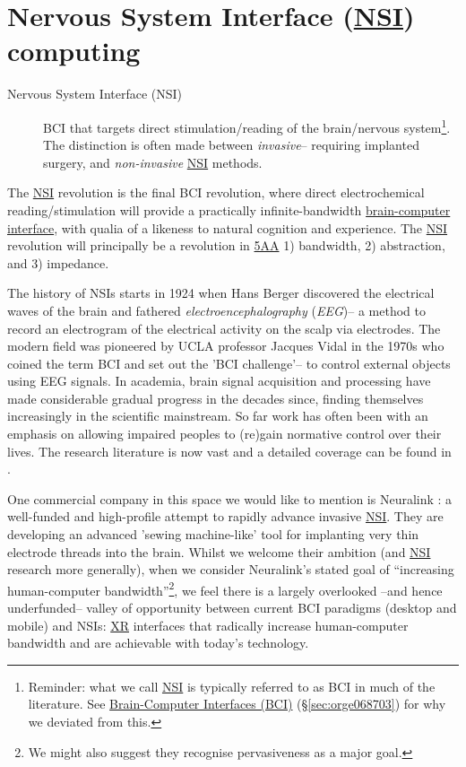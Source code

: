 \documentclass[logo,bsc,singlespacing,parskip]{infthesis}
\begin{document}
\section{Nervous System Interface (\hyperref[org559faaa]{NSI}) computing}
\label{sec:org109b124}
\begin{mdframed}
\begin{description}
\item[{Nervous System Interface (\label{org559faaa}NSI)}] BCI that targets direct stimulation/reading of the brain/nervous system\footnote{Reminder: what we call \hyperref[org559faaa]{NSI} is typically referred to as BCI in much of the literature. See \hyperref[sec:orge068703]{Brain-Computer Interfaces (BCI)} (\S \ref{sec:orge068703}) for why we deviated from this.}.
The distinction is often made between \emph{invasive}-- requiring implanted surgery, and \emph{non-invasive} \hyperref[org559faaa]{NSI} methods.
\end{description}
\end{mdframed}

The \hyperref[org559faaa]{NSI} revolution is the final BCI revolution, where direct electrochemical reading/stimulation will provide a practically infinite-bandwidth \hyperref[org805b132]{brain-computer interface}, with qualia of a likeness to natural cognition and experience.
The \hyperref[org559faaa]{NSI} revolution will principally be a revolution in \hyperref[org7b75b93]{5AA} 1) bandwidth, 2) abstraction, and 3) impedance.

The history of NSIs starts in 1924 when Hans Berger discovered the electrical waves of the brain and fathered \emph{electroencephalography} (\emph{EEG})--  a method to record an electrogram of the electrical activity on the scalp via electrodes.
The modern field was pioneered by UCLA professor Jacques Vidal in the 1970s who coined the term BCI and set out the 'BCI challenge'-- to control external objects using EEG signals.
In academia, brain signal acquisition and processing have made considerable gradual progress in the decades since, finding themselves increasingly in the scientific mainstream.
So far work has often been with an emphasis on allowing impaired peoples to (re)gain normative control over their lives.
The research literature is now vast and a detailed coverage can be found in \autocite{kawala-sterniukSummaryFiftyYears2021}.

One commercial company in this space we would like to mention is Neuralink \autocite{muskNeuralink}: a well-funded and high-profile attempt to rapidly advance invasive \hyperref[org559faaa]{NSI}.
They are developing an advanced 'sewing machine-like' tool for implanting very thin electrode threads into the brain.
Whilst we welcome their ambition (and \hyperref[org559faaa]{NSI} research more generally), when we consider Neuralink's stated goal of ``increasing human-computer bandwidth''\footnote{We might also suggest they recognise pervasiveness as a major goal.}, we feel there is a largely overlooked --and hence underfunded-- valley of opportunity between current BCI paradigms (desktop and mobile) and NSIs: \hyperref[org88b0f70]{XR} interfaces that radically increase human-computer bandwidth and are achievable with today's technology.
\end{document}

